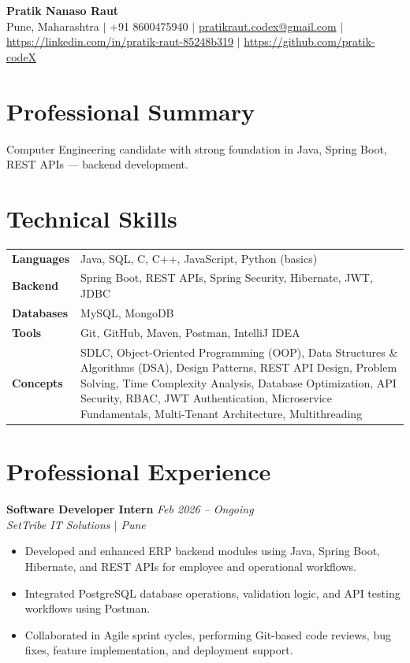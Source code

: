 \documentclass[11pt,a4paper]{article}
\begin{document}
\begin{center}
{\Large\bfseries Pratik Nanaso Raut}\\[4pt]
Pune, Maharashtra $|$ +91 8600475940 $|$ \href{mailto:pratikraut.codex@gmail.com}{pratikraut.codex@gmail.com} $|$ \href{https://linkedin.com/in/pratik-raut-85248b319}{https://linkedin.com/in/pratik-raut-85248b319} $|$ \href{https://github.com/pratik-codeX}{https://github.com/pratik-codeX}
\end{center}
\vspace{-2pt}
\section{Professional Summary}
Computer Engineering candidate with strong foundation in Java, Spring Boot, REST APIs — backend development.
\section{Technical Skills}
\begin{tabular}{@{}p{}p{}@{}}
\textbf{Languages} & Java, SQL, C, C++, JavaScript, Python (basics) \\[1pt]
\textbf{Backend} & Spring Boot, REST APIs, Spring Security, Hibernate, JWT, JDBC \\[1pt]
\textbf{Databases} & MySQL, MongoDB \\[1pt]
\textbf{Tools} & Git, GitHub, Maven, Postman, IntelliJ IDEA \\[1pt]
\textbf{Concepts} & SDLC, Object-Oriented Programming (OOP), Data Structures \& Algorithms (DSA), Design Patterns, REST API Design, Problem Solving, Time Complexity Analysis, Database Optimization, API Security, RBAC, JWT Authentication, Microservice Fundamentals, Multi-Tenant Architecture, Multithreading \\
\end{tabular}
\section{Professional Experience}
\textbf{Software Developer Intern} \hfill \textit{Feb 2026 -- Ongoing}
\\\textit{SetTribe IT Solutions $|$ Pune}
\begin{itemize}
  \item Developed and enhanced ERP backend modules using Java, Spring Boot, Hibernate, and REST APIs for employee and operational workflows.
  \item Integrated PostgreSQL database operations, validation logic, and API testing workflows using Postman.
  \item Collaborated in Agile sprint cycles, performing Git-based code reviews, bug fixes, feature implementation, and deployment support.
\end{itemize}
\end{document}
